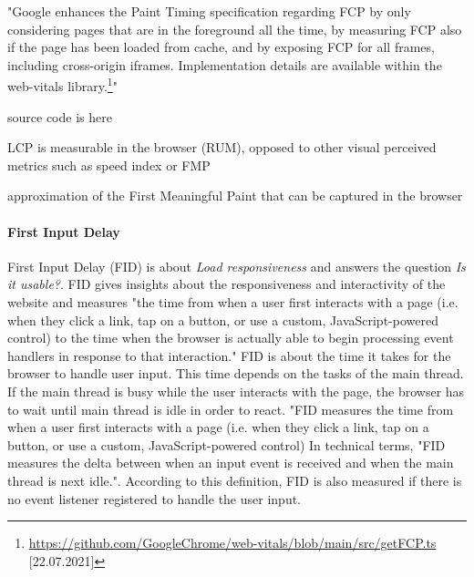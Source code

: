 "Google enhances the Paint Timing specification regarding FCP by only considering pages that are in the foreground all the time,
by measuring FCP also if the page has been loaded from cache, and by exposing FCP for all frames, including cross-origin iframes.
Implementation details are available within the web-vitals library.\footnote{\url{https://github.com/GoogleChrome/web-vitals/blob/main/src/getFCP.ts} [22.07.2021]}"

source code is here %


LCP is measurable in the browser (RUM), opposed to other visual perceived metrics such as speed index or FMP

approximation of the First Meaningful Paint that can be captured in the browser



 





\paragraph{First Input Delay}


First Input Delay (FID) is about \textit{Load responsiveness} and answers the question \textit{Is it usable?}.
FID gives insights about the responsiveness and interactivity of the website and measures "the time from when a user first interacts with a page (i.e. when they click a link, tap on a button, or use a custom, JavaScript-powered control) to the time when the browser is actually able to begin processing event handlers in response to that interaction."
FID is about the time it takes for the browser to handle user input.
This time depends on the tasks of the main thread.
If the main thread is busy while the user interacts with the page, the browser has to wait until main thread is idle in order to react.
"FID measures the time from when a user first interacts with a page (i.e. when they click a link, tap on a button, or use a custom, JavaScript-powered control) In technical terms, "FID measures the delta between when an input event is received and when the main thread is next idle.".
According to this definition, FID is also measured if there is no event listener registered to handle the user input.

